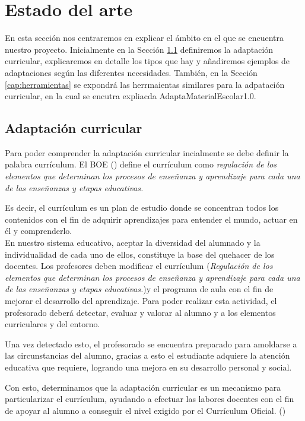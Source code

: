 \chapter{Estado del arte}
\label{cap:estadoDelArte}
En esta sección nos centraremos en explicar el ámbito en el que se encuentra nuestro proyecto. Inicialmente en la Sección \ref{cap:adaptacion} definiremos la adaptación curricular, explicaremos en detalle los tipos que hay y añadiremos ejemplos de adaptaciones según las diferentes necesidades. También, en la Sección \ref{cap:herramientas}  se expondrá las herrmaientas similares para la adpatación curricular, en la cual se encutra expliacda AdaptaMaterialEscolar1.0. 

\section{Adaptación curricular}\label{cap:adaptacion}
\nocite{adaptacionCurricular}
\nocite{adaptacionCurricular2}
Para poder comprender la adaptación curricular incialmente se debe definir la palabra currículum. El BOE (\citeyear{BOE2}) define el currículum como \textit{ regulación de los elementos que determinan los procesos de enseñanza y
aprendizaje para cada una de las enseñanzas y etapas educativas.}

Es decir, el currículum es un plan de estudio donde se concentran todos los contenidos con el fin de adquirir aprendizajes para entender el mundo, actuar en él y comprenderlo. 
\\

En nuestro sistema educativo, aceptar la diversidad del alumnado y la individualidad de cada uno de ellos, constituye la base del quehacer de los docentes. Los profesores deben modificar el currículum (\textit{Regulación de los elementos que determinan los procesos de enseñanza y aprendizaje para cada una de las enseñanzas y etapas educativas.})y el programa de aula con el fin de mejorar el desarrollo del aprendizaje. Para poder realizar esta actividad, el profesorado deberá detectar, evaluar y valorar al alumno y a los elementos curriculares y del entorno.

Una vez detectado esto, el profesorado se encuentra preparado para amoldarse a las circunstancias del alumno, gracias a esto el estudiante adquiere la atención educativa que requiere, logrando una mejora en su desarrollo personal y social.

Con esto, determinamos que la adaptación curricular es un mecanismo para particularizar el currículum, ayudando a efectuar las labores docentes con el fin de apoyar al alumno a conseguir el nivel exigido por el Currículum Oficial. (\cite{adaptacionIntro})

